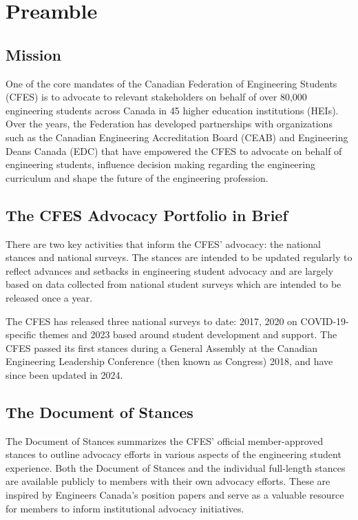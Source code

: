 \section{Preamble}\label{preamble}

\subsection{Mission}\label{mission}

One of the core mandates of the Canadian Federation of Engineering Students (CFES) is to advocate to relevant stakeholders on behalf of over 80,000 engineering students across Canada in 45 higher education institutions (HEIs). Over the years, the Federation has developed partnerships with organizations such as the Canadian Engineering Accreditation Board (CEAB) and Engineering Deans Canada (EDC) that have empowered the CFES to advocate on behalf of engineering students, influence decision making regarding the engineering curriculum and shape the future of the engineering profession.

\subsection{The CFES Advocacy Portfolio in Brief}\label{the-cfes-advocacy-portfolio-in-brief}

There are two key activities that inform the CFES' advocacy: the national stances and national surveys. The stances are intended to be updated regularly to reflect advances and setbacks in engineering student advocacy and are largely based on data collected from national student surveys which are intended to be released once a year.

The CFES has released three national surveys to date: 2017, 2020 on COVID-19-specific themes and 2023 based around student development and support. The CFES passed its first stances during a General Assembly at the Canadian Engineering Leadership Conference (then known as Congress) 2018, and have since been updated in 2024.

\subsection{The Document of Stances}\label{the-document-of-stances}

The Document of Stances summarizes the CFES' official member-approved stances to outline advocacy efforts in various aspects of the engineering student experience. Both the Document of Stances and the individual full-length stances are available publicly to members with their own advocacy efforts. These are inspired by Engineers Canada's position papers and serve as a valuable resource for members to inform institutional advocacy initiatives.

\newpage
